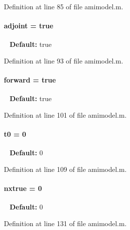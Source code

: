Definition at line 85 of file amimodel.\+m.

\hypertarget{classamimodel_ab6d500b41cf50693452415caca31d32e}{}
\paragraph[{adjoint}]{\setlength{\rightskip}{0pt plus 5cm}adjoint = true}\label{classamimodel_ab6d500b41cf50693452415caca31d32e}
~\newline
{\bfseries Default\+:} true 

Definition at line 93 of file amimodel.\+m.

\hypertarget{classamimodel_a81e42e48c9c72814166c8f7cd414ce24}{}
\paragraph[{forward}]{\setlength{\rightskip}{0pt plus 5cm}forward = true}\label{classamimodel_a81e42e48c9c72814166c8f7cd414ce24}
~\newline
{\bfseries Default\+:} true 

Definition at line 101 of file amimodel.\+m.

\hypertarget{classamimodel_abdb5a42ffee3ca622484b53a322f1004}{}
\paragraph[{t0}]{\setlength{\rightskip}{0pt plus 5cm}t0 = 0}\label{classamimodel_abdb5a42ffee3ca622484b53a322f1004}
~\newline
{\bfseries Default\+:} 0 

Definition at line 109 of file amimodel.\+m.

\hypertarget{classamimodel_a49c476de14a021114feb8c95da04952a}{}
\paragraph[{nxtrue}]{\setlength{\rightskip}{0pt plus 5cm}nxtrue = 0}\label{classamimodel_a49c476de14a021114feb8c95da04952a}
~\newline
{\bfseries Default\+:} 0 

Definition at line 131 of file amimodel.\+m.

